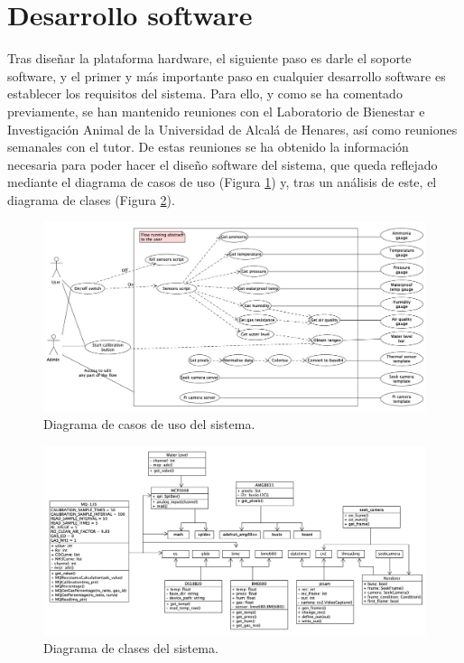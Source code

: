 \section{Desarrollo software}
\label{sec:dessw}
Tras diseñar la plataforma hardware, el siguiente paso es darle el soporte software, y el primer y más importante paso en cualquier desarrollo software es establecer los requisitos del sistema. Para ello, y como se ha comentado previamente, se han mantenido reuniones con el Laboratorio de Bienestar e Investigación Animal de la Universidad de Alcalá de Henares, así como reuniones semanales con el tutor. De estas reuniones se ha obtenido la información necesaria para poder hacer el diseño software del sistema, que queda reflejado mediante el diagrama de casos de uso (Figura \ref{fig:casos}) y, tras un análisis de este, el diagrama de clases (Figura \ref{fig:umlet}).\\
\begin{figure} [h!]
  \begin{center}
    \includegraphics[width=17cm]{figs/casos}
  \end{center}
  \caption{Diagrama de casos de uso del sistema.}
  \label{fig:casos}
\end{figure}

\begin{figure} [h!]
  \begin{center}
    \includegraphics[width=17cm]{figs/umlet}
  \end{center}
  \caption{Diagrama de clases del sistema.}
  \label{fig:umlet}
\end{figure}

